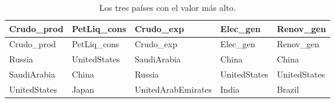 \documentclass[oneside, openany, fontset=libertinus]{mitthesis}
\begin{document}
\begin{longtable}[]{@{}
  >{\raggedright\arraybackslash}p{}
  >{\raggedright\arraybackslash}p{}
  >{\raggedright\arraybackslash}p{}
  >{\raggedright\arraybackslash}p{}
  >{\raggedright\arraybackslash}p{}@{}}
\caption{Los tres países con el valor más alto.}\tabularnewline
\toprule\noalign{}
\begin{minipage}[b]{\linewidth}\raggedright
Crudo\_prod
\end{minipage} & \begin{minipage}[b]{\linewidth}\raggedright
PetLiq\_cons
\end{minipage} & \begin{minipage}[b]{\linewidth}\raggedright
Crudo\_exp
\end{minipage} & \begin{minipage}[b]{\linewidth}\raggedright
Elec\_gen
\end{minipage} & \begin{minipage}[b]{\linewidth}\raggedright
Renov\_gen
\end{minipage} \\
\midrule\noalign{}
\endfirsthead
\toprule\noalign{}
\begin{minipage}[b]{\linewidth}\raggedright
Crudo\_prod
\end{minipage} & \begin{minipage}[b]{\linewidth}\raggedright
PetLiq\_cons
\end{minipage} & \begin{minipage}[b]{\linewidth}\raggedright
Crudo\_exp
\end{minipage} & \begin{minipage}[b]{\linewidth}\raggedright
Elec\_gen
\end{minipage} & \begin{minipage}[b]{\linewidth}\raggedright
Renov\_gen
\end{minipage} \\
\midrule\noalign{}
\endhead
\bottomrule\noalign{}
\endlastfoot
Russia & UnitedStates & SaudiArabia & China & China \\
SaudiArabia & China & Russia & UnitedStates & UnitedStates \\
UnitedStates & Japan & UnitedArabEmirates & India & Brazil \\
\end{longtable}
\end{document}
